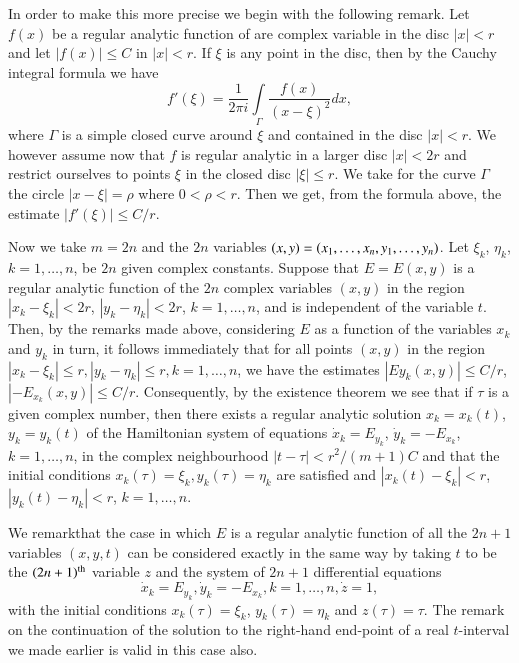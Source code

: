 In order to make this more precise we begin with the following remark. Let $f(x)$ be a regular analytic function of are complex variable in the disc $|x|<r$ and let $|f(x)| \leq C$ in $|x| <r$. If $\xi$ is any point in the disc, then by the Cauchy integral formula we have
$$
f'(\xi) = \frac{1}{2\pi i} \int\limits_\Gamma \frac{f(x)}{(x-\xi)^2} dx,
$$\pageoriginale
where $\Gamma$ is a simple closed curve around $\xi$ and contained in the disc $|x| <r$. We however assume now that $f$ is regular analytic in a larger disc $|x|<2r$ and restrict ourselves to points $\xi$ in the closed disc $|\xi| \leq r$. We take for the curve $\Gamma$ the circle $|x-\xi| = \rho$ where $0 <\rho < r$. Then we get, from the formula above, the estimate $|f'(\xi)| \leq C/r$.

Now we take $m=2n$ and the $2n$ variables $(x,y) = (x_1, \ldots, x_n, y_1,\break \ldots, y_n)$. Let $\xi_k$, $\eta_k$, $k=1, \ldots,n$, be $2n$ given complex constants. Suppose that $E = E(x,y)$ is a regular analytic function of the $2n$ complex variables $(x,y)$ in the region $|x_k - \xi_k| < 2r$, $|y_k - \eta_k| < 2r$, $k=1, \ldots, n$, and is independent of the variable $t$. Then, by the remarks  made above, considering $E$ as a function of the variables $x_k$ and $y_k$ in turn, it follows immediately that for all points $(x,y)$ in the region $|x_k - \xi_k| \leq r,|y_k -\eta_k| \leq r, k=1,\ldots,n$, we have the estimates $|Ey_k(x,y)| \leq C/r$, $|-E_{x_k}(x,y)| \leq C/r$. Consequently, by the existence theorem we see that if $\tau$ is a given complex number, then there exists a regular analytic solution $x_k = x_k (t)$, $y_k = y_k (t)$ of the Hamiltonian system of equations $\dot{x}_k = E_{y_k}$, $\dot{y}_k = - E_{x_k}$, $k=1, \ldots, n$, in the complex neighbourhood $|t-\tau| <r^2 / (m+1)C$ and that the initial conditions $x_k(\tau) = \xi_k, y_k(\tau) = \eta_k$ are satisfied and $|x_k(t) - \xi_k| <r$, $|y_k(t) -\eta_k| <r$, $k=1, \ldots,n$.


We remark\pageoriginale that the case in which $E$ is a regular analytic function of all the $2n+1$ variables $(x,y,t)$ can be considered exactly in the same way by taking $t$ to be the $(2n+1)^{\rm th}$ variable $z$ and the system of $2n+1$ differential equations
$$
\dot{x}_k = E_{y_k}, \dot{y}_k = - E_{x_k}, k = 1, \ldots, n , \dot{z} =1,
$$
with the initial conditions $x_k(\tau) = \xi_k$, $y_k(\tau) = \eta_k$ and $z(\tau) = \tau$. The remark on the continuation of the solution to the right-hand end-point of a real $t$-interval we made earlier is valid in this case also.
